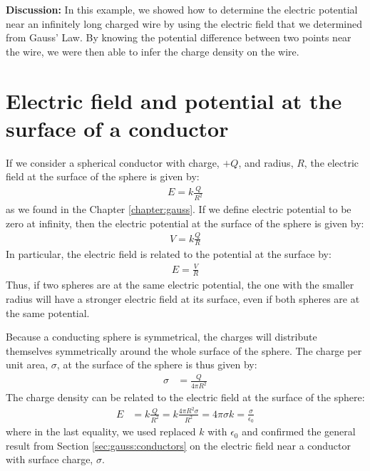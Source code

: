\begin{example}
\textbf{Discussion: }In this example, we showed how to determine the electric potential near an infinitely long charged wire by using the electric field that we determined from Gauss' Law. By knowing the potential difference between two points near the wire, we were then able to infer the charge density on the wire.
\end{example}

\section{Electric field and potential at the surface of a conductor}
If we consider a spherical conductor with charge, $+Q$, and radius, $R$, the electric field at the surface of the sphere is given by:
\begin{align*}
E=k\frac{Q}{R^2}
\end{align*}
as we found in the Chapter \ref{chapter:gauss}. If we define electric potential to be zero at infinity, then the electric potential at the surface of the sphere is given by:
\begin{align*}
V=k\frac{Q}{R}
\end{align*}
In particular, the electric field is related to the potential at the surface by:
\begin{align*}
E=\frac{V}{R}
\end{align*}
Thus, if two spheres are at the same electric potential, the one with the smaller radius will have a stronger electric field at its surface, even if both spheres are at the same potential.

Because a conducting sphere is symmetrical, the charges will distribute themselves symmetrically around the whole surface of the sphere. The charge per unit area, $\sigma$, at the surface of the sphere is thus given by:
\begin{align*}
\sigma &= \frac{Q}{4\pi R^2}
\end{align*}
The charge density can be related to the electric field at the surface of the sphere:
\begin{align*}
E&=k\frac{Q}{R^2}=k\frac{4\pi R^2\sigma}{R^2}=4\pi\sigma k=\frac{\sigma}{\epsilon_0}
\end{align*}
where in the last equality, we used replaced $k$ with $\epsilon_0$ and confirmed the general result from Section \ref{sec:gauss:conductors} on the electric field near a conductor with surface charge, $\sigma$. 

